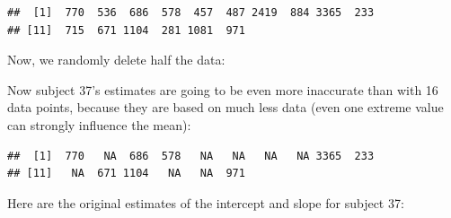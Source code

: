 \documentclass[
  12pt,
]{krantz}
\newenvironment{Shaded}{\begin{snugshade}}{\end{snugshade}}
\newcommand{\AttributeTok}[1]{\textcolor[rgb]{0.77,0.63,0.00}{#1}}
\newcommand{\ConstantTok}[1]{\textcolor[rgb]{0.00,0.00,0.00}{#1}}
\newcommand{\DecValTok}[1]{\textcolor[rgb]{0.00,0.00,0.81}{#1}}
\newcommand{\FunctionTok}[1]{\textcolor[rgb]{0.00,0.00,0.00}{#1}}
\newcommand{\NormalTok}[1]{#1}
\newcommand{\OtherTok}[1]{\textcolor[rgb]{0.56,0.35,0.01}{#1}}
\newcommand{\SpecialCharTok}[1]{\textcolor[rgb]{0.00,0.00,0.00}{#1}}
\newcommand{\StringTok}[1]{\textcolor[rgb]{0.31,0.60,0.02}{#1}}
\theoremstyle{definition}
\theoremstyle{definition}
\theoremstyle{definition}
\theoremstyle{definition}
\theoremstyle{remark}
\begin{document}
\begin{verbatim}
##  [1]  770  536  686  578  457  487 2419  884 3365  233
## [11]  715  671 1104  281 1081  971
\end{verbatim}

Now, we randomly delete half the data:

\begin{Shaded}
\end{Shaded}

Now subject 37's estimates are going to be even more inaccurate than with 16 data points, because they are based on much less data (even one extreme value can strongly influence the mean):

\begin{Shaded}
\end{Shaded}

\begin{verbatim}
##  [1]  770   NA  686  578   NA   NA   NA   NA 3365  233
## [11]   NA  671 1104   NA   NA  971
\end{verbatim}

Here are the original estimates of the intercept and slope for subject 37:

\begin{Shaded}
\end{Shaded}
\end{document}
